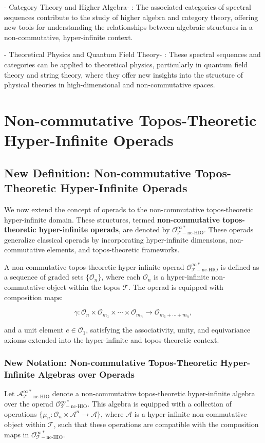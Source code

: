 \documentclass{article}
\begin{document}
-  Category Theory and Higher Algebra- : The associated categories of spectral sequences contribute to the study of higher algebra and category theory, offering new tools for understanding the relationships between algebraic structures in a non-commutative, hyper-infinite context.

-  Theoretical Physics and Quantum Field Theory- : These spectral sequences and categories can be applied to theoretical physics, particularly in quantum field theory and string theory, where they offer new insights into the structure of physical theories in high-dimensional and non-commutative spaces.



\section{Non-commutative Topos-Theoretic Hyper-Infinite Operads}
\subsection{New Definition: Non-commutative Topos-Theoretic Hyper-Infinite Operads}
We now extend the concept of operads to the non-commutative topos-theoretic hyper-infinite domain. These structures, termed \textbf{non-commutative topos-theoretic hyper-infinite operads}, are denoted by \(\mathcal{O}_{\mathcal{T}-\text{nc-HIO}}^{\infty *}\). These operads generalize classical operads by incorporating hyper-infinite dimensions, non-commutative elements, and topos-theoretic frameworks.

A non-commutative topos-theoretic hyper-infinite operad \(\mathcal{O}_{\mathcal{T}-\text{nc-HIO}}^{\infty *}\) is defined as a sequence of graded sets \(\{\mathcal{O}_n\}\), where each \(\mathcal{O}_n\) is a hyper-infinite non-commutative object within the topos \(\mathcal{T}\). The operad is equipped with composition maps:

\[
\gamma: \mathcal{O}_{n} \times \mathcal{O}_{m_1} \times \cdots \times \mathcal{O}_{m_n} \to \mathcal{O}_{m_1 + \cdots + m_n},
\]

and a unit element \(e \in \mathcal{O}_{1}\), satisfying the associativity, unity, and equivariance axioms extended into the hyper-infinite and topos-theoretic context.

\subsubsection{New Notation: Non-commutative Topos-Theoretic Hyper-Infinite Algebras over Operads}
Let \(\mathcal{A}_{\mathcal{T}-\text{nc-HIO}}^{\infty *}\) denote a non-commutative topos-theoretic hyper-infinite algebra over the operad \(\mathcal{O}_{\mathcal{T}-\text{nc-HIO}}^{\infty *}\). This algebra is equipped with a collection of operations \(\{ \mu_n: \mathcal{O}_n \times \mathcal{A}^n \to \mathcal{A} \}\), where \(\mathcal{A}\) is a hyper-infinite non-commutative object within \(\mathcal{T}\), such that these operations are compatible with the composition maps in \(\mathcal{O}_{\mathcal{T}-\text{nc-HIO}}^{\infty *}\).
\end{document}
